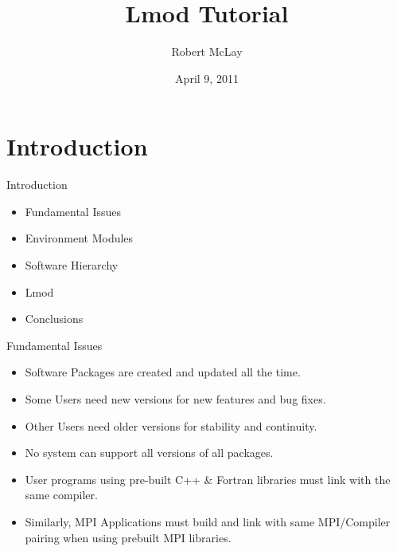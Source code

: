 \documentclass{beamer}
\title{Lmod Tutorial}
\author{Robert McLay}
\institute{The Texas Advanced Computing Center}
\date{April 9, 2011}  %
\begin{document}
\begin{frame}
  \titlepage
\end{frame}

\section{Introduction}

\begin{frame}{Introduction}
  \begin{itemize}
    \item Fundamental Issues
    \item Environment Modules
    \item Software Hierarchy
    \item Lmod
    \item Conclusions
  \end{itemize}
\end{frame}


\begin{frame}{Fundamental Issues}
  \begin{itemize}
    \item Software Packages are created and updated all the time.
    \item Some Users need new versions for new features and bug fixes.
    \item Other Users need older versions for stability and continuity.
    \item No system can support all versions of all packages.
    \item User programs using pre-built C++ \& Fortran libraries must
      link with the same compiler.
    \item Similarly, MPI Applications must build and link with same
      MPI/Compiler pairing when using prebuilt MPI libraries.
  \end{itemize}
\end{frame}
\end{document}
